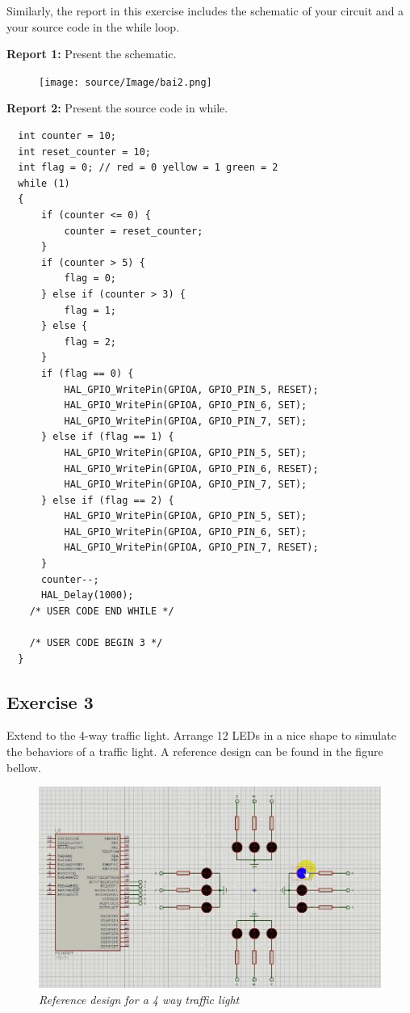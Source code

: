 Similarly, the report in this exercise includes the schematic of your circuit and a your source code in the while loop.

\textbf{Report 1: } Present the schematic.\\

\begin{figure}[!htp]
    \centering
    \texttt{[image: source/Image/bai2.png]}
\end{figure}

\textbf{Report 2: } Present the source code in while.\\

\begin{lstlisting}
  int counter = 10;
  int reset_counter = 10;
  int flag = 0; // red = 0 yellow = 1 green = 2
  while (1)
  {
	  if (counter <= 0) {
		  counter = reset_counter;
	  }
	  if (counter > 5) {
		  flag = 0;
	  } else if (counter > 3) {
		  flag = 1;
	  } else {
		  flag = 2;
	  }
	  if (flag == 0) {
		  HAL_GPIO_WritePin(GPIOA, GPIO_PIN_5, RESET);
		  HAL_GPIO_WritePin(GPIOA, GPIO_PIN_6, SET);
		  HAL_GPIO_WritePin(GPIOA, GPIO_PIN_7, SET);
	  } else if (flag == 1) {
		  HAL_GPIO_WritePin(GPIOA, GPIO_PIN_5, SET);
		  HAL_GPIO_WritePin(GPIOA, GPIO_PIN_6, RESET);
		  HAL_GPIO_WritePin(GPIOA, GPIO_PIN_7, SET);
	  } else if (flag == 2) {
		  HAL_GPIO_WritePin(GPIOA, GPIO_PIN_5, SET);
		  HAL_GPIO_WritePin(GPIOA, GPIO_PIN_6, SET);
		  HAL_GPIO_WritePin(GPIOA, GPIO_PIN_7, RESET);
	  }
	  counter--;
	  HAL_Delay(1000);
    /* USER CODE END WHILE */

    /* USER CODE BEGIN 3 */
  }
\end{lstlisting}

\subsection{Exercise 3}
Extend to the 4-way traffic light. Arrange 12 LEDs in a nice shape to simulate the behaviors of a traffic light. A reference design can be found in the figure bellow.

\begin{figure}[!htp]
    \centering
    \includegraphics[width=5in]{source/picture/bai_1/pic2.jpg}
    \caption{\textit{Reference design for a 4 way traffic light}}
    \label{bai1_pic2}
\end{figure}

